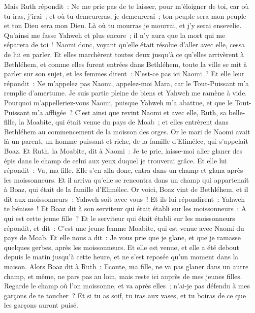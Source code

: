\begin{multicols}{2}
Mais Ruth répondit~: Ne me prie pas de te laisser, pour m'éloigner de toi, car où tu iras, j'irai~; et où tu demeureras, je demeurerai~; ton peuple sera mon peuple et ton Dieu sera mon Dieu.
Là où tu mourras je mourrai, et j'y serai ensevelie. Qu'ainsi me fasse Yahweh et plus encore~; il n'y aura que la mort qui me séparera de toi~!
Naomi donc, voyant qu'elle était résolue d'aller avec elle, cessa de lui en parler.
Et elles marchèrent toutes deux jusqu'à ce qu'elles arrivèrent à Bethléhem, et comme elles furent entrées dans Bethléhem, toute la ville se mit à parler sur son sujet, et les femmes dirent~: N'est-ce pas ici Naomi~?
Et elle leur répondit~: Ne m'appelez pas Naomi, appelez-moi Mara, car le Tout-Puissant m'a remplie d'amertume.
Je suis partie pleine de biens et Yahweh me ramène à vide. Pourquoi m'appelleriez-vous Naomi, puisque Yahweh m'a abattue, et que le Tout-Puissant m'a affligée~?
C'est ainsi que revint Naomi et avec elle, Ruth, sa belle-fille, la Moabite, qui était venue du pays de Moab~; et elles entrèrent dans Bethléhem au commencement de la moisson des orges.
\VerseOne{}Or le mari de Naomi avait là un parent, un homme puissant et riche, de la famille d'Elimélec, qui s'appelait Boaz.
Et Ruth, la Moabite, dit à Naomi~: Je te prie, laisse-moi aller glaner des épis dans le champ de celui aux yeux duquel je trouverai grâce. Et elle lui répondit~: Va, ma fille.
Elle s'en alla donc, entra dans un champ et glana après les moissonneurs. Et il arriva qu'elle se rencontra dans un champ qui appartenait à Boaz, qui était de la famille d'Elimélec.
Or voici, Boaz vint de Bethléhem, et il dit aux moissonneurs~: Yahweh soit avec vous~! Et ils lui répondirent~: Yahweh te bénisse~!
Et Boaz dit à son serviteur qui était établi sur les moissonneurs~: A qui est cette jeune fille~?
Et le serviteur qui était établi sur les moissonneurs répondit, et dit~: C'est une jeune femme Moabite, qui est venue avec Naomi du pays de Moab.
Et elle nous a dit~: Je vous prie que je glane, et que je ramasse quelques gerbes, après les moissonneurs. Et elle est venue, et elle a été debout depuis le matin jusqu'à cette heure, et ne s'est reposée qu'un moment dans la maison.
Alors Boaz dit à Ruth~: Ecoute, ma fille, ne va pas glaner dans un autre champ, et même, ne pars pas au loin, mais reste ici auprès de mes jeunes filles.
Regarde le champ où l'on moissonne, et va après elles~; n'ai-je pas défendu à mes garçons de te toucher~? Et si tu as soif, tu iras aux vases, et tu boiras de ce que les garçons auront puisé.

\end{multicols}

